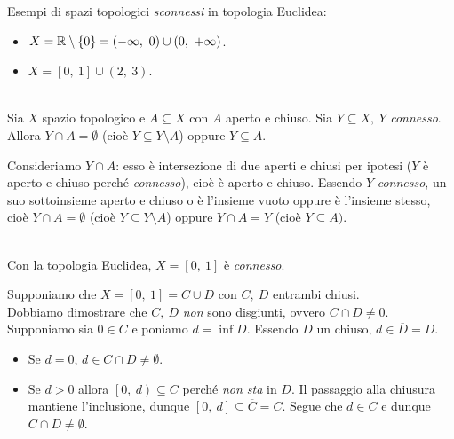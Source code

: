 \begin{examples} Esempi di spazi topologici \textit{sconnessi} in topologia Euclidea:
	\begin{itemize}
		\item $X=\realset\setminus\left\{0\right\}=\left(-\infty,\ 0\right)\cup \left(0,\ +\infty\right)$.
		\item $X=\left[0,\ 1\right]\cup \left(2,\ 3\right)$.
	\end{itemize}
\vspace{-3mm}
\end{examples}
\begin{lemming}~{}\label{connessodisgiuntoosottoinsieme}\\
Sia $X$ spazio topologico e $A\subseteq X$ con $A$ aperto e chiuso. Sia $Y\subseteq X,\ Y$ \textit{connesso}. Allora $Y\cap A=\emptyset$ (cioè $Y\subseteq Y\setminus A$) oppure $Y\subseteq A$.
\end{lemming}
\begin{demonstration}
Consideriamo $Y\cap A$: esso è intersezione di due aperti e chiusi per ipotesi ($Y$ è aperto e chiuso perché \textit{connesso}), cioè è aperto e chiuso. Essendo $Y$ \textit{connesso}, un suo sottoinsieme aperto e chiuso o è l'insieme vuoto oppure è l'insieme stesso, cioè $Y\cap A=\emptyset$ (cioè $Y\subseteq Y\setminus A$) oppure $Y\cap A=Y$ (cioè $Y\subseteq A)$.
\end{demonstration}
\begin{theorema}~{}\\
Con la topologia Euclidea, $X=\left[0,\ 1\right]$ è \textit{connesso}.
\end{theorema}
\begin{demonstration}
Supponiamo che $X=\left[0,\ 1\right]=C\cup D$ con $C,\ D$ entrambi chiusi.\\
Dobbiamo dimostrare che $C,\ D$ \textit{non} sono disgiunti, ovvero $C\cap D\neq 0$. Supponiamo sia $0\in C$ e poniamo $d=\inf D$. Essendo $D$ un chiuso, $d\in \overline{D}=D$.
\begin{itemize}
	\item Se $d=0$, $d\in C\cap D\neq \emptyset$.
	\item Se $d>0$ allora $\left[0,\ d\right)\subseteq C$ perché \textit{non sta} in $D$. Il passaggio alla chiusura mantiene l'inclusione, dunque $\left[0,\ d\right]\subseteq \overline{C}=C$. Segue che $d\in C$ e dunque $C\cap D\neq \emptyset$.
\end{itemize}
\vspace{-3mm}
\end{demonstration}
